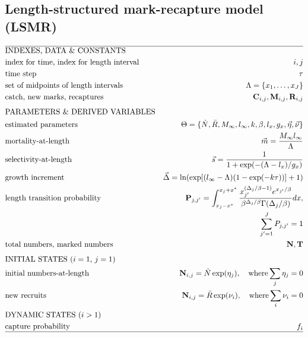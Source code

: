 \subsection{Length-structured mark-recapture model (LSMR)}






\begin{table}
  \centering
\caption{Data, parameters, and analytical procedures for the length-based mark-recapture model.}\label{table:LSMRmodel} 
\tableEq
	\begin{small}
    \begin{align}
        \hline
		&\mbox{INDEXES, DATA \& CONSTANTS} \nonumber\\
		&\mbox{index for time, index for length interval} 
		&i,j \label{eq:T1.1}\\ 
		&\mbox{time step}  & \tau\\
		&\mbox{set of midpoints of length intervals}
		&\Lambda = \{x_1, \ldots,x_J\}\\
		&\mbox{catch, new marks, recaptures} 
		&\mathbf{C}_{i,j}, \mathbf{M}_{i,j}, \mathbf{R}_{i,j}\\[1ex]
		&\mbox{PARAMETERS \& DERIVED VARIABLES} \nonumber\\
		&\mbox{estimated parameters} 
		&\Theta=\{\dot{N},\bar{R},M_\infty,l_\infty,k,\beta,l_x,g_x,
			\vec{\eta},\vec{\nu} \}\\
		&\mbox{mortality-at-length} 
		& \vec{m} = \frac{M_\infty l_\infty}{\Lambda}
		\label{eq:T1.6}\\
		&\mbox{selectivity-at-length} 
		& \vec{s} = \frac{1}{1+\exp(-(\Lambda-l_x)/g_x)}
		\label{eq:T1.7}\\
		&\mbox{growth increment} 
		& \vec{\Delta} = \ln( \exp[(l_\infty-\Lambda)(1-\exp(-k \tau))] +1)
		\label{eq:T1.8}\\
		&\mbox{length transition probability}
		& \mathbf{P}_{j,j'} =\int_{x_j-x^*}^{x_j+x^*} \frac{x_{j'}^{(\Delta_{j}/\beta-1)}
		e^{x_{j'}/\beta}}{\beta^{\Delta_{j}/\beta} \Gamma(\Delta_{j}/\beta)}dx, \nonumber\\
		& &\quad \sum_{j'=1}^J P_{j,j'}= 1 
		\label{eq:T1.9}\\
		&\mbox{total numbers, marked numbers} 
		& \mathbf{N}, \mathbf{T}\\[1ex]
		&\mbox{INITIAL STATES ($i=1$, $j=1$)}  \nonumber\\
		&\mbox{initial numbers-at-length}
		&\mathbf{N}_{i,j} = \dot{N}\exp(\eta_j), \quad \mbox{where} \sum_j \eta_j=0
		\label{eq:T1.11}\\
		&\mbox{new recruits}
		&\mathbf{N}_{i,j} = \bar{R}\exp(\nu_i), \quad \mbox{where} \sum_i \nu_i=0
		\label{eq:T1.12}\\
		&\mbox{DYNAMIC STATES ($i>1$)} \nonumber\\
		&\mbox{capture probability} 
		& f_i\\
		\hline \nonumber
    \end{align}
\end{small}
    \normalEq
\end{table}


